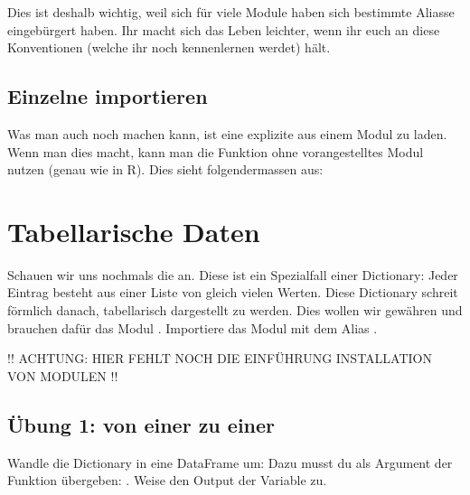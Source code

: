 \documentclass[letterpaper,10pt,english]{sphinxmanual}
\begin{document}
Dies ist deshalb wichtig, weil sich für viele Module haben sich bestimmte Aliasse eingebürgert haben. Ihr macht sich das Leben leichter, wenn ihr euch an diese Konventionen (welche ihr noch kennenlernen werdet) hält.


\section{Einzelne  importieren}
\label{\detokenize{01_03_Python_Module:einzelne-function-importieren}}
Was man auch noch machen kann, ist eine explizite  aus einem Modul zu laden. Wenn man dies macht, kann man die Funktion ohne vorangestelltes Modul nutzen (genau wie in R). Dies sieht folgendermassen aus:

\begin{sphinxVerbatim}[commandchars=\\\{\}]
   
\end{sphinxVerbatim}


\chapter{Tabellarische Daten}
\label{\detokenize{01_04_Tabellarische_Daten:tabellarische-daten}}\label{\detokenize{01_04_Tabellarische_Daten::doc}}
Schauen wir uns nochmals die   an. Diese ist ein Spezialfall einer Dictionary: Jeder Eintrag besteht aus einer Liste von gleich vielen Werten. Diese Dictionary schreit förmlich danach, tabellarisch dargestellt zu werden. Dies wollen wir gewähren und brauchen dafür das Modul . Importiere das Modul mit dem Alias .

!! ACHTUNG: HIER FEHLT NOCH DIE EINFÜHRUNG INSTALLATION VON MODULEN !!


\section{Übung 1: von einer  zu einer }
\label{\detokenize{01_04_Tabellarische_Daten:ubung-1-von-einer-dictionary-zu-einer-dataframe}}
Wandle die Dictionary  in eine DataFrame um: Dazu musst du  als Argument der Funktion  übergeben: . Weise den Output der Variable  zu.
\end{document}
